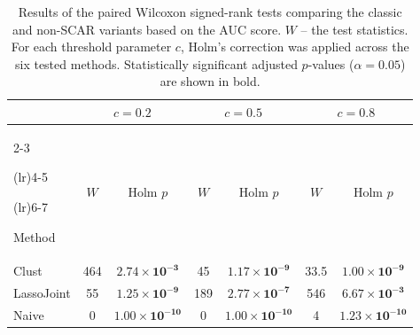 \documentclass[11pt]{article}
\begin{document}
 
\begin{table}[H] 

\caption{Results of the paired Wilcoxon signed-rank tests comparing the classic and non-SCAR variants based on the AUC score. $W$ -- the test statistics. For each threshold parameter $c$, Holm's correction was applied across the six tested methods. Statistically significant adjusted $p$-values ($\alpha=0.05$) are shown in bold.} 

\label{tab:wilcoxon_auc} 

\centering 

\begin{tabular}{lcccccc} 

\toprule 

& \multicolumn{2}{c}{$c=0.2$} 

& \multicolumn{2}{c}{$c=0.5$} 

& \multicolumn{2}{c}{$c=0.8$} \\ 

\cmidrule(lr){2-3} 

\cmidrule(lr){4-5} 

\cmidrule(lr){6-7} 

Method 

& $W$ & Holm $p$ 

& $W$ & Holm $p$ 

& $W$ & Holm $p$ \\ 

\midrule 

Clust 

& 464 & $\mathbf{2.74\times10^{-3}}$ 

& 45  & $\mathbf{1.17\times10^{-9}}$ 

& 33.5 & $\mathbf{1.00\times10^{-9}}$ \\ 

 

LassoJoint 

& 55  & $\mathbf{1.25\times10^{-9}}$ 

& 189 & $\mathbf{2.77\times10^{-7}}$ 

& 546 & $\mathbf{6.67\times10^{-3}}$ \\ 

 

Naive 

& 0   & $\mathbf{1.00\times10^{-10}}$ 

& 0   & $\mathbf{1.00\times10^{-10}}$ 

& 4   & $\mathbf{1.23\times10^{-10}}$ \\ 

 


\end{tabular}
\end{table}
\end{document}
